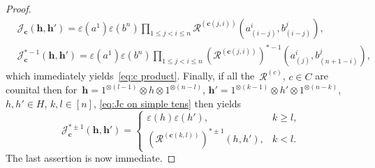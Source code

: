 \documentclass[12pt, reqno]{amsart}
\theoremstyle{definition}
\numberwithin{equation}{section}
\newcommand{\tensor}{\otimes}
\begin{document}
\begin{proof}
\begin{align}
&\mathcal J_{\mathbf c}(\mathbf h,
\mathbf h')
=\varepsilon(a^1)\varepsilon(b^{n})
\prod_{1\le j<i\le n}
\mathcal R^{(\mathbf c(j,i))}(a^{i}_{(i-j)},b^{j}_{(i-j)}),\nonumber\\
&\mathcal J_{\mathbf c}^{\ast-1}(\mathbf h,\mathbf h')=
\varepsilon(a^1)\varepsilon(b^{n})
\prod_{1\le j<i\le n} 
(\mathcal R^{(\mathbf c(j,i))})^{\ast-1}(a^i_{(j)},b^{j}_{(n+1-i)}),\label{eq:Jc on simple tens}
\end{align}
which immediately yields~\eqref{eq:c product}.
Finally, if all the~$\mathcal R^{(c)}$, $c\in C$
are counital then
for~$\mathbf h=1^{\tensor (l-1)}\tensor h\tensor 1^{\tensor (n-l)}$, $\mathbf h'=1^{\tensor (k-1)}
\tensor h'\tensor 1^{\tensor(n-k)}$, $h,h'\in H$, $k,l\in[n]$, \eqref{eq:Jc on simple tens} then yields
\begin{equation*}
\mathcal J_{\mathbf c}^{\ast\pm 1}(\mathbf h,\mathbf h')
=\begin{cases}
\varepsilon(h)\varepsilon(h'),& k\ge l,\\
(\mathcal R^{(\mathbf c(k,l))})^{\ast\pm 1}(h,h'),& k<l.
\end{cases}
\end{equation*}
The last assertion is now immediate.
\end{proof}
\end{document}
